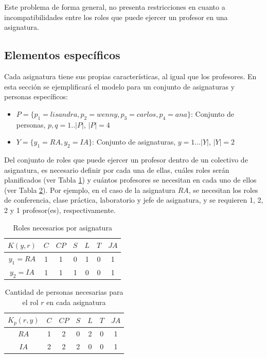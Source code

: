 Este problema de forma general, no presenta restricciones en cuanto a incompatibilidades entre los roles que puede ejercer un profesor en una asignatura.


\subsection{Elementos específicos}

Cada asignatura tiene sus propias características, al igual que los profesores. En esta sección se ejemplificará el modelo para un conjunto de asignaturas y personas específicos:
\begin{itemize}
	\item $P=\{p_1=lisandra, p_2=wenny, p_3=carlos, p_4=ana\}$: Conjunto de personas, $p, q= 1.. |P|$, $|P|=4$
	
	\item $Y=\{y_1=RA,y_2=IA\}$: Conjunto de asignaturas, $y = 1\ldots |Y|$, $|Y|=2$
\end{itemize}

Del conjunto de roles que puede ejercer un profesor dentro de un colectivo de asignatura, es necesario definir por cada una de ellas, cuáles roles serán planificados (ver Tabla \ref{cpr-carga}) y cuántos profesores se necesitan en cada uno de ellos (ver Tabla \ref{cpnr-carga}). Por ejemplo, en el caso de la asignatura $RA$, se necesitan los roles de conferencia, clase práctica, laboratorio y jefe de asignatura, y se requieren 1, 2, 2 y 1 profesor(es), respectivamente.
\begin{table}[H]
	\centering
	\caption{Roles necesarios por asignatura}\label{cpr-carga}
	\begin{tabular}{|c|c|c|c|c|c|c|}
		\hline
		$K(y,r)$ & $C$ & $CP$& $S$ & $L$ & $T$ & $JA$ \\ \hline
		$y_1=RA$  	 &  1  &  1  &  0  &  1  &  0 &  1\\ \hline
		$y_2=IA$ 	 &  1  &  1  &  1  &  0  &  0 &  1\\ \hline
	\end{tabular}
\end{table}

\begin{table}[H]
	\centering
	\caption{Cantidad de personas necesarias para el rol $r$ en cada asignatura}\label{cpnr-carga}
	\begin{tabular}{|c|c|c|c|c|c|c|}
		\hline
		$K_{p}(r, y)$ & $C$ & $CP$& $S$& $L$& $T$ & $JA$ \\ \hline
		$RA$       &  1  &  2  &  0 &  2 &  0 &  1  \\ \hline
		$IA$       &  2  &  2  &  2 &  0 &  0  & 1 \\ \hline
	\end{tabular}
\end{table}



